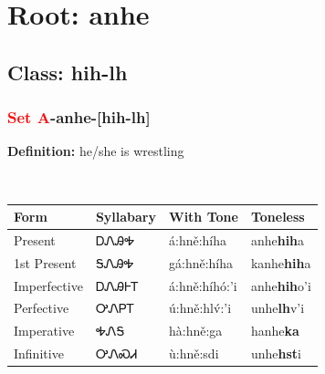 \needspace{4in}
\section*{Root: anhe}
\nopagebreak
{}
\needspace{3in}
\subsection*{Class: hih-lh}
\nopagebreak
\needspace{2in}
\subsubsection*{\textcolor{Red}{Set A}{-}\textbf{anhe}{-}[hih-lh]}
\nopagebreak
\textbf{Definition: } he/she is wrestling
\\[0.5em]
\begin{tabularx}{\textwidth}{l X X X}%
\toprule%
\textbf{Form}&\textbf{Syllabary}&\textbf{With Tone}&\textbf{Toneless}\\%
\midrule%
Present&ᎠᏁᎯᎭ&á:hně:híha&anhe\textbf{hih}a\\%
1st Present&ᎦᏁᎯᎭ&gá:hně:híha&kanhe\textbf{hih}a\\%
Imperfective&ᎠᏁᎯᎰᎢ&á:hně:híhó:’i&anhe\textbf{hih}o'i\\%
Perfective&ᎤᏁᏢᎢ&ú:hně:hlv́:’i&unhe\textbf{lh}v'i\\%
Imperative&ᎭᏁᎦ&hà:hně:ga&hanhe\textbf{ka}\\%
Infinitive&ᎤᏁᏍᏗ&ù:hně:sdi&unhe\textbf{hst}i\\%
\bottomrule%
\end{tabularx}
\\[1em]